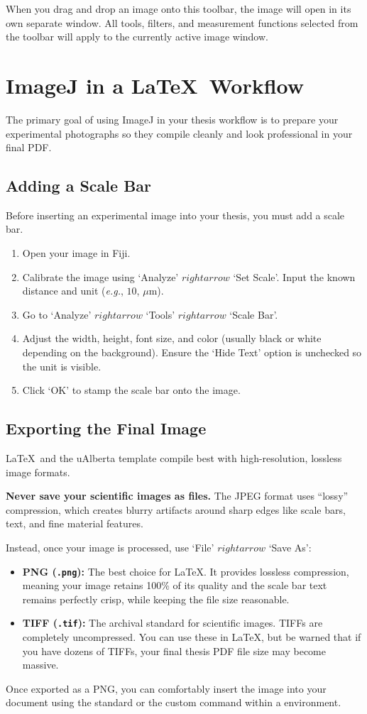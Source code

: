 			When you drag and drop an image onto this toolbar, the image will open in its own separate window. 
			All tools, filters, and measurement functions selected from the toolbar will apply to the currently active image window.

	\section{ImageJ in a \LaTeX\ Workflow}
		The primary goal of using ImageJ in your thesis workflow is to prepare your experimental photographs so they compile cleanly and look professional in your final PDF.

		\subsection{Adding a Scale Bar}
			Before inserting an experimental image into your thesis, you must add a scale bar. 
			\begin{enumerate}
				\item Open your image in Fiji.
				\item Calibrate the image using `Analyze' \(rightarrow\) `Set Scale'. Input the known distance and unit (\textit{e.g.}, \(10\), \(\mu\)m).
				\item Go to `Analyze' \(rightarrow\) `Tools' \(rightarrow\) `Scale Bar'.
				\item Adjust the width, height, font size, and color (usually black or white depending on the background). Ensure the `Hide Text' option is unchecked so the unit is visible.
				\item Click `OK' to stamp the scale bar onto the image.
			\end{enumerate}

		\subsection{Exporting the Final Image}
			\LaTeX\ and the uAlberta template compile best with high-resolution, lossless image formats.
			
			\textbf{Never save your scientific images as  files.} 
			The JPEG format uses \enquote{lossy} compression, which creates blurry artifacts around sharp edges like scale bars, text, and fine material features. 

			Instead, once your image is processed, use `File' \(rightarrow\) `Save As':
			\begin{itemize}
				\item \textbf{PNG (\texttt{.png}):} The best choice for \LaTeX. 
					It provides lossless compression, meaning your image retains 100\% of its quality and the scale bar text remains perfectly crisp, while keeping the file size reasonable.
				\item \textbf{TIFF (\texttt{.tif}):} The archival standard for scientific images. 
					TIFFs are completely uncompressed. 
					You can use these in \LaTeX, but be warned that if you have dozens of TIFFs, your final thesis PDF file size may become massive.
			\end{itemize}

			Once exported as a PNG, you can comfortably insert the image into your document using the standard   or the custom  command within a  environment.